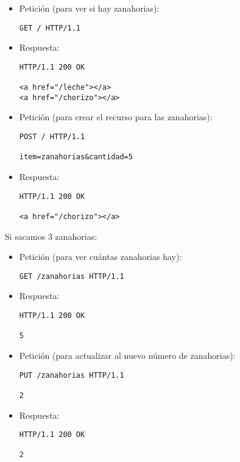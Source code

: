 \begin{itemize}
\item Petición (para ver si hay zanahorias):
\begin{verbatim}
GET / HTTP/1.1
\end{verbatim}

\item Respuesta:
\begin{verbatim}
HTTP/1.1 200 OK

<a href="/leche"></a>
<a href="/chorizo"></a>
\end{verbatim}

\item Petición (para crear el recurso para las zanahorias):
\begin{verbatim}
POST / HTTP/1.1

item=zanahorias&cantidad=5
\end{verbatim}

\item Respuesta:
\begin{verbatim}
HTTP/1.1 200 OK

<a href="/chorizo"></a>
\end{verbatim}

\end{itemize}

Si sacamos 3 zanahorias:

\begin{itemize}
\item Petición (para ver cuántas zanahorias hay):
\begin{verbatim}
GET /zanahorias HTTP/1.1
\end{verbatim}

\item Respuesta:
\begin{verbatim}
HTTP/1.1 200 OK

5
\end{verbatim}

\item Petición (para actualizar al nuevo número de zanahorias):
\begin{verbatim}
PUT /zanahorias HTTP/1.1

2
\end{verbatim}

\item Respuesta:
\begin{verbatim}
HTTP/1.1 200 OK

2
\end{verbatim}

\end{itemize}

